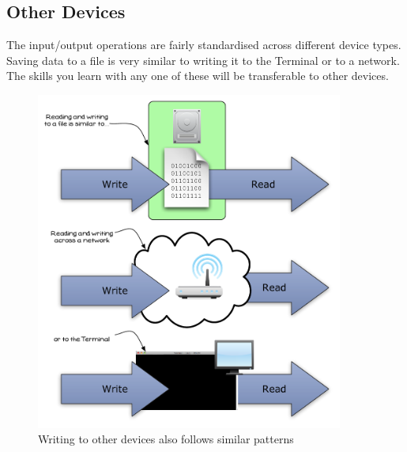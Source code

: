 \clearpage
\subsection{Other Devices} %
\label{sub:other_devices}

The input/output operations are fairly standardised across different device types. Saving data to a file is very similar to writing it to the Terminal or to a network. The skills you learn with any one of these will be transferable to other devices.

\begin{figure}[h]
   \centering
   \includegraphics[width=0.9\textwidth]{./topics/file-io/diagrams/OtherDevices} 
   \caption{Writing to other devices also follows similar patterns}
   \label{fig:other-devices}
\end{figure}



